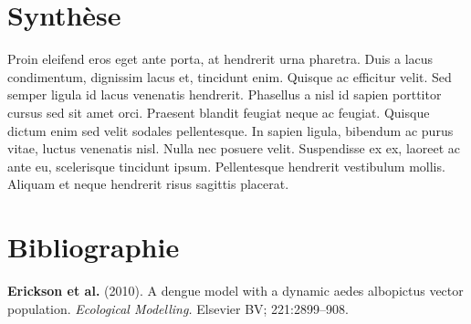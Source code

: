 \documentclass[
  12pt,
  oneside]{article}
\begin{document}
\hypertarget{synthuxe8se}{%
\section{Synthèse}\label{synthuxe8se}}

Proin eleifend eros eget ante porta, at hendrerit urna pharetra. Duis a
lacus condimentum, dignissim lacus et, tincidunt enim. Quisque ac
efficitur velit. Sed semper ligula id lacus venenatis hendrerit.
Phasellus a nisl id sapien porttitor cursus sed sit amet orci. Praesent
blandit feugiat neque ac feugiat. Quisque dictum enim sed velit sodales
pellentesque. In sapien ligula, bibendum ac purus vitae, luctus
venenatis nisl. Nulla nec posuere velit. Suspendisse ex ex, laoreet ac
ante eu, scelerisque tincidunt ipsum. Pellentesque hendrerit vestibulum
mollis. Aliquam et neque hendrerit risus sagittis placerat.

\hypertarget{bibliographie}{%
\section*{Bibliographie}\label{bibliographie}}

\hypertarget{refs}{}
\leavevmode\hypertarget{ref-Erickson_2010}{}%
\textbf{Erickson et al.} (2010). A dengue model with a dynamic aedes
albopictus vector population. \emph{Ecological Modelling.} Elsevier BV;
221:2899--908.
\end{document}
